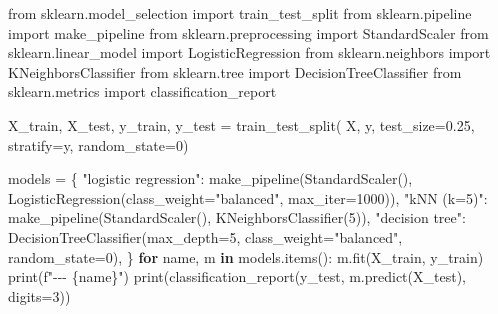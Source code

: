 \documentclass[
  letterpaper,
  DIV=11,
  numbers=noendperiod]{scrreprt}
\newenvironment{Shaded}{\begin{snugshade}}{\end{snugshade}}
\newcommand{\BuiltInTok}[1]{\textcolor[rgb]{0.00,0.23,0.31}{#1}}
\newcommand{\ControlFlowTok}[1]{\textcolor[rgb]{0.00,0.23,0.31}{\textbf{#1}}}
\newcommand{\DecValTok}[1]{\textcolor[rgb]{0.68,0.00,0.00}{#1}}
\newcommand{\FloatTok}[1]{\textcolor[rgb]{0.68,0.00,0.00}{#1}}
\newcommand{\ImportTok}[1]{\textcolor[rgb]{0.00,0.46,0.62}{#1}}
\newcommand{\KeywordTok}[1]{\textcolor[rgb]{0.00,0.23,0.31}{\textbf{#1}}}
\newcommand{\NormalTok}[1]{\textcolor[rgb]{0.00,0.23,0.31}{#1}}
\newcommand{\OperatorTok}[1]{\textcolor[rgb]{0.37,0.37,0.37}{#1}}
\newcommand{\SpecialCharTok}[1]{\textcolor[rgb]{0.37,0.37,0.37}{#1}}
\newcommand{\SpecialStringTok}[1]{\textcolor[rgb]{0.13,0.47,0.30}{#1}}
\newcommand{\StringTok}[1]{\textcolor[rgb]{0.13,0.47,0.30}{#1}}
\begin{document}
\begin{Shaded}
\begin{Highlighting}[]
\ImportTok{from}\NormalTok{ sklearn.model\_selection }\ImportTok{import}\NormalTok{ train\_test\_split}
\ImportTok{from}\NormalTok{ sklearn.pipeline }\ImportTok{import}\NormalTok{ make\_pipeline}
\ImportTok{from}\NormalTok{ sklearn.preprocessing }\ImportTok{import}\NormalTok{ StandardScaler}
\ImportTok{from}\NormalTok{ sklearn.linear\_model }\ImportTok{import}\NormalTok{ LogisticRegression}
\ImportTok{from}\NormalTok{ sklearn.neighbors }\ImportTok{import}\NormalTok{ KNeighborsClassifier}
\ImportTok{from}\NormalTok{ sklearn.tree }\ImportTok{import}\NormalTok{ DecisionTreeClassifier}
\ImportTok{from}\NormalTok{ sklearn.metrics }\ImportTok{import}\NormalTok{ classification\_report}

\NormalTok{X\_train, X\_test, y\_train, y\_test }\OperatorTok{=}\NormalTok{ train\_test\_split(}
\NormalTok{    X, y, test\_size}\OperatorTok{=}\FloatTok{0.25}\NormalTok{, stratify}\OperatorTok{=}\NormalTok{y, random\_state}\OperatorTok{=}\DecValTok{0}\NormalTok{)}

\NormalTok{models }\OperatorTok{=}\NormalTok{ \{}
    \StringTok{"logistic regression"}\NormalTok{: make\_pipeline(StandardScaler(), LogisticRegression(class\_weight}\OperatorTok{=}\StringTok{"balanced"}\NormalTok{, max\_iter}\OperatorTok{=}\DecValTok{1000}\NormalTok{)),}
    \StringTok{"kNN (k=5)"}\NormalTok{: make\_pipeline(StandardScaler(), KNeighborsClassifier(}\DecValTok{5}\NormalTok{)),}
    \StringTok{"decision tree"}\NormalTok{: DecisionTreeClassifier(max\_depth}\OperatorTok{=}\DecValTok{5}\NormalTok{, class\_weight}\OperatorTok{=}\StringTok{"balanced"}\NormalTok{, random\_state}\OperatorTok{=}\DecValTok{0}\NormalTok{),}
\NormalTok{\}}
\ControlFlowTok{for}\NormalTok{ name, m }\KeywordTok{in}\NormalTok{ models.items():}
\NormalTok{    m.fit(X\_train, y\_train)}
    \BuiltInTok{print}\NormalTok{(}\SpecialStringTok{f"{-}{-}{-} }\SpecialCharTok{\{}\NormalTok{name}\SpecialCharTok{\}}\SpecialStringTok{"}\NormalTok{)}
    \BuiltInTok{print}\NormalTok{(classification\_report(y\_test, m.predict(X\_test), digits}\OperatorTok{=}\DecValTok{3}\NormalTok{))}
\end{Highlighting}
\end{Shaded}
\end{document}

